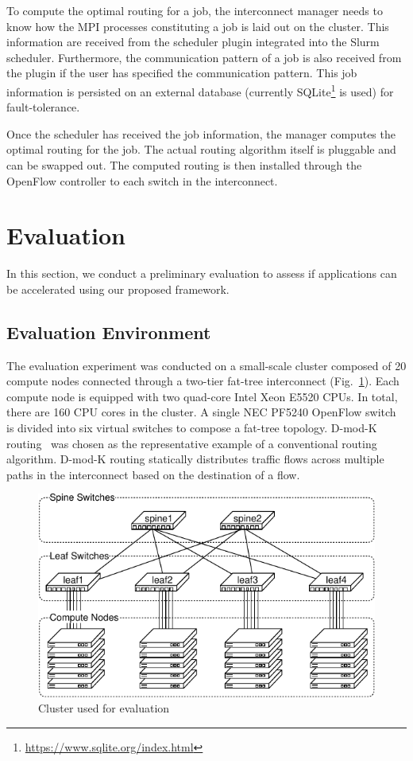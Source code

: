 \documentclass[graybox]{svmult}
\begin{document}
To compute the optimal routing for a job, the interconnect manager needs to
know how the MPI processes constituting a job is laid out on the cluster.
This information are received from the scheduler plugin integrated into the
Slurm scheduler. Furthermore, the communication pattern of a job is also
received from the plugin if the user has specified the communication pattern.
This job information is persisted on an external database (currently
SQLite\footnote{\url{https://www.sqlite.org/index.html}} is used) for
fault-tolerance.

Once the scheduler has received the job information, the manager computes the
optimal routing for the job. The actual routing algorithm itself is pluggable
and can be swapped out. The computed routing is then installed through the
OpenFlow controller to each switch in the interconnect.

\section{Evaluation}\label{kt:sec:iv}

In this section, we conduct a preliminary evaluation to assess if applications
can be accelerated using our proposed framework.

\subsection{Evaluation Environment}

The evaluation experiment was conducted on a small-scale cluster composed of
20 compute nodes connected through a two-tier fat-tree interconnect
(Fig.~\ref{kt:fig:cluster}). Each compute node is equipped with two quad-core
Intel Xeon E5520 CPUs. In total, there are 160 CPU cores in the cluster. A
single NEC PF5240 OpenFlow switch is divided into six virtual switches to
compose a fat-tree topology. D-mod-K routing~\cite{Rodriguez2009} was chosen
as the representative example of a conventional routing algorithm. D-mod-K
routing statically distributes traffic flows across multiple paths in the
interconnect based on the destination of a flow.

\begin{figure}
    \centering
    \includegraphics{evaluation_cluster}
    \caption{Cluster used for evaluation}%
    \label{kt:fig:cluster}
\end{figure}
\end{document}

